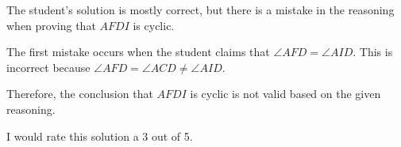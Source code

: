 The student's solution is mostly correct, but there is a mistake in the reasoning when proving that $AFDI$ is cyclic.

The first mistake occurs when the student claims that $\angle AFD = \angle AID$. This is incorrect because $\angle AFD = \angle ACD \neq \angle AID$. 

Therefore, the conclusion that $AFDI$ is cyclic is not valid based on the given reasoning. 

I would rate this solution a 3 out of 5.
